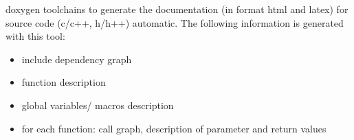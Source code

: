 \label{sec:core_tools_doxygen}
doxygen toolchains to generate the documentation (in format html and latex) for source code (c/c++, h/h++) automatic. 
The following information is generated with this tool:
\begin{itemize}
	\item include dependency graph 
	\item function description
	\item global variables/ macros description
	\item for each function: call graph, description of parameter and return values 
\end{itemize}


